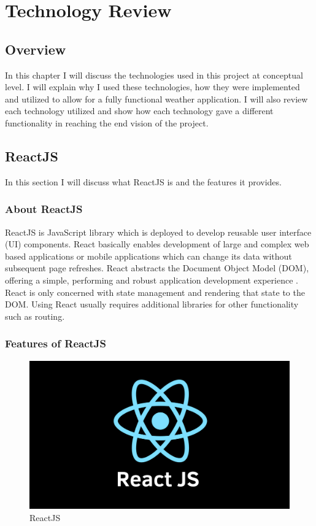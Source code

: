 \chapter{Technology Review}
\section{Overview}
In this chapter I will discuss the technologies used in this project at conceptual level. I will explain why I used these technologies, how they were implemented and utilized to allow for a fully functional weather application. I will also review each technology utilized and show how each technology gave a different functionality in reaching the end vision of the project. 

\section{ReactJS}
In this section I will discuss what ReactJS is and the features it provides.

\subsection{About ReactJS}
ReactJS is JavaScript library which is deployed to develop reusable user interface (UI) components. React basically enables development of large and complex web based applications or mobile applications which can change its data without subsequent page refreshes. React abstracts the Document Object Model (DOM), offering a simple, performing and robust application development experience \cite{aggarwal2018modern}. React is only concerned with state management and rendering that state to the DOM. Using React usually requires additional libraries for other functionality such as routing.


\subsection{Features of ReactJS}

\begin{figure}[h]
\centering
\includegraphics[scale=0.3]{img/ReactJS.png}
\caption{ReactJS}
\label{React}
\end{figure}


